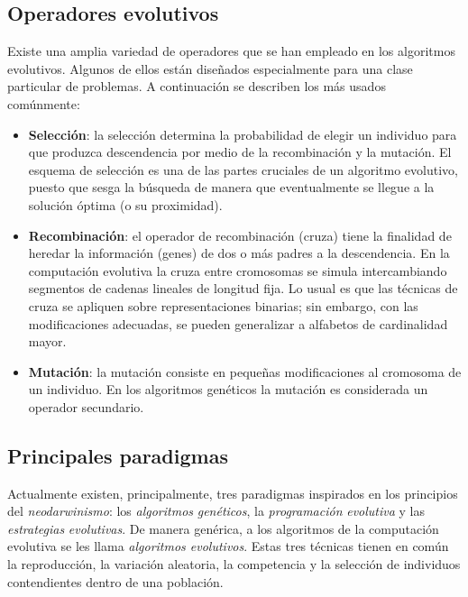   \subsection{Operadores evolutivos}

  Existe una amplia variedad de operadores que se han empleado en los algoritmos evolutivos. Algunos de ellos est\'an 
  dise\~nados especialmente para una clase particular de problemas. A continuaci\'on se describen los m\'as usados com\'unmente:

  \begin{itemize}
   \item \textbf{Selecci\'on}: la selecci\'on determina la probabilidad de elegir un individuo para que produzca descendencia por medio 
   de la recombinaci\'on y la mutaci\'on. El esquema de selecci\'on es una de las partes cruciales de un algoritmo evolutivo, puesto 
   que sesga la b\'usqueda de manera que eventualmente se llegue a la soluci\'on \'optima (o su proximidad).
   \item \textbf{Recombinaci\'on}: el operador de recombinaci\'on (cruza) tiene la finalidad de heredar la informaci\'on (genes) 
   de dos o m\'as padres a la descendencia. En la computaci\'on evolutiva la cruza entre cromosomas se simula intercambiando segmentos 
   de cadenas lineales de longitud fija. Lo usual es que las t\'ecnicas de cruza se apliquen sobre representaciones binarias; sin embargo, 
   con las modificaciones adecuadas, se pueden generalizar a alfabetos de cardinalidad mayor.
   \item \textbf{Mutaci\'on}: la mutaci\'on consiste en peque\~nas modificaciones al cromosoma de un individuo. En los 
   algoritmos gen\'eticos la mutaci\'on es considerada un operador secundario.
  \end{itemize}

  \subsection{Principales paradigmas}

  Actualmente existen, principalmente, tres paradigmas inspirados en los principios del \textit{neodarwinismo}: los \textit{algoritmos}
  \textit{gen\'eticos}, la \textit{programaci\'on} \textit{evolutiva} y las \textit{estrategias} \textit{evolutivas}. De manera gen\'erica, 
  a los algoritmos de la computaci\'on evolutiva se les llama \textit{algoritmos evolutivos}. Estas tres t\'ecnicas tienen en com\'un la 
  reproducci\'on, la variaci\'on aleatoria, la competencia y la selecci\'on de individuos contendientes dentro de una poblaci\'on. 

